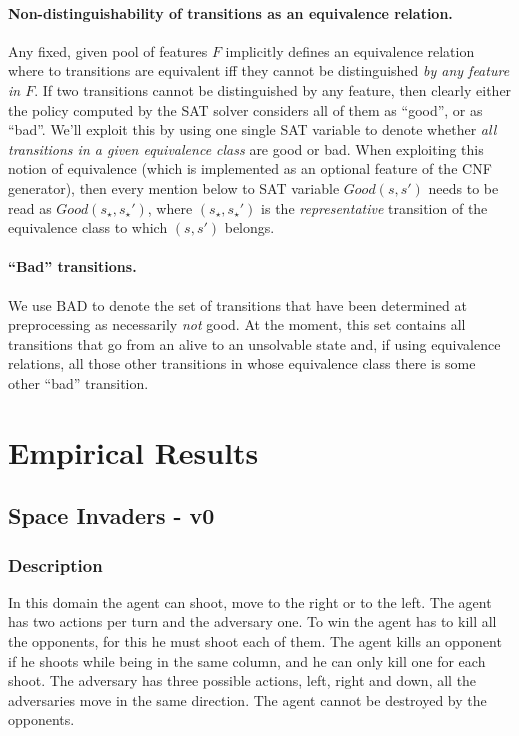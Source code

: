 \documentclass[a4paper]{article}
\newcommand{\badtx}{\ensuremath{\mathrm{BAD}}}
\begin{document}
\paragraph{Non-distinguishability of transitions as an equivalence relation.}
Any fixed, given pool of features $F$ implicitly defines an equivalence relation where to transitions are
equivalent iff they cannot be distinguished \emph{by any feature in $F$}.
If two transitions cannot be distinguished by any feature, then clearly either the policy computed by the SAT solver
considers all of them as ``good'', or as ``bad''.
We'll exploit this by using one single SAT variable to denote whether \emph{all transitions in a given equivalence
class} are good or bad. When exploiting this notion of equivalence (which is implemented as an optional feature of
the CNF generator), then every mention below to SAT variable $Good(s, s')$ needs to be read as $Good(s_{\star}, s_{\star}')$,
where $(s_{\star}, s_{\star}')$ is the \emph{representative} transition of the equivalence class to which $(s, s')$ belongs.

\paragraph{``Bad'' transitions.}
We use \badtx{} to denote the set of transitions that have been determined at preprocessing as necessarily
\emph{not} good.
At the moment, this set contains all transitions that go from an alive to an unsolvable state and, if using
equivalence relations, all those other transitions in whose equivalence class there is some other ``bad'' transition.


\newpage

\section{Empirical Results}


\subsection{Space Invaders - v0}
\subsubsection{Description}
In this domain the agent can shoot, move to the right or to the left. The agent has two actions per turn and the adversary one. To win the agent has to kill all the opponents, for this he must shoot each of them. The agent kills an opponent if he shoots while being in the same column, and he can only kill one for each shoot. The adversary has three possible actions, left, right and down, all the adversaries move in the same direction. The agent cannot be destroyed by the opponents.
\end{document}
